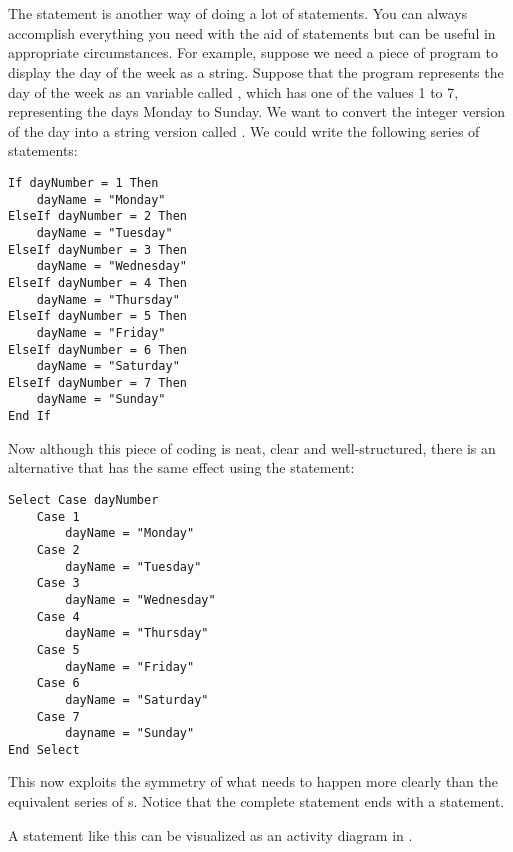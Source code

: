 	\section{}
		The  statement is another way of doing a lot of  statements. You can always accomplish everything you need with the aid of  statements but  can be useful in appropriate circumstances. For example, suppose we need a piece of program to display the day of the week as a string. Suppose that the program represents the day of the week as an  variable called , which has one of the values 1 to 7, representing the days Monday to Sunday. We want to convert the integer version of the day into a string version called . We could write the following series of  statements:
		\begin{lstlisting}
If dayNumber = 1 Then
	dayName = "Monday"
ElseIf dayNumber = 2 Then
	dayName = "Tuesday"
ElseIf dayNumber = 3 Then
	dayName = "Wednesday"
ElseIf dayNumber = 4 Then
	dayName = "Thursday"
ElseIf dayNumber = 5 Then
	dayName = "Friday"
ElseIf dayNumber = 6 Then
	dayName = "Saturday"
ElseIf dayNumber = 7 Then
	dayName = "Sunday"
End If
		\end{lstlisting}
		Now although this piece of coding is neat, clear and well-structured, there is an alternative that has the same effect using the  statement:
\begin{lstlisting}
Select Case dayNumber
	Case 1
		dayName = "Monday"
	Case 2
		dayName = "Tuesday"
	Case 3
		dayName = "Wednesday"
	Case 4
		dayName = "Thursday"
	Case 5
		dayName = "Friday"
	Case 6
		dayName = "Saturday"
	Case 7
		dayname = "Sunday"
End Select
\end{lstlisting}
		This now exploits the symmetry of what needs to happen more clearly than the equivalent series of s. Notice that the complete  statement ends with a  statement.

		A  statement like this can be visualized as an activity diagram in .


